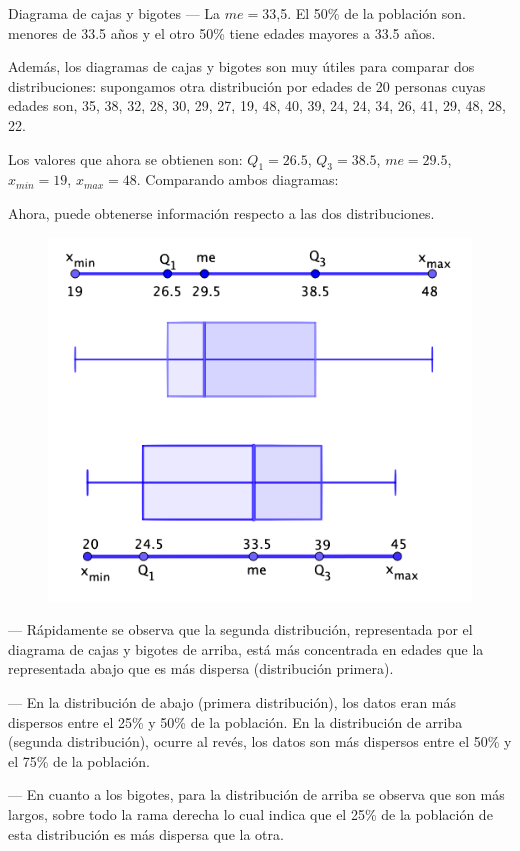 \begin{myalertblock}{Diagrama de cajas y bigotes}
	\vspace{1mm} --- La $me=$33,5. El 50\% de la población son. menores de 33.5 años y el otro 50\% tiene edades mayores a 33.5 años.
	
	\vspace{2mm} Además, los diagramas de cajas y bigotes son muy útiles para comparar dos distribuciones: supongamos otra distribución por edades de 20 personas cuyas edades son, 35, 38, 32, 28, 30, 29, 27, 19, 48, 40, 39, 24, 24, 34, 26, 41, 29, 48, 28, 22.
	
	\vspace{2mm} Los valores que ahora se obtienen son: $Q_1=26.5$, $Q_3=38.5$, $me=29.5$, $x_{min}=19$, $x_{max}=48$. Comparando ambos diagramas:
	
	\vspace{2mm} Ahora, puede obtenerse información respecto a las dos distribuciones.
	 
	 \begin{figure}[H]
			\centering
			\includegraphics[width=.65\textwidth]{imagenes/imagenes01/T01IM16.png}
	\end{figure}
	
	\vspace{1mm} --- Rápidamente se observa que la segunda distribución, representada por el diagrama de cajas y bigotes de arriba, está más concentrada en edades que la representada abajo que es más dispersa (distribución primera). 
	
	\vspace{1mm} --- En la distribución de abajo (primera distribución), los datos eran más dispersos entre el 25\% y 50\% de la población. En la distribución de arriba (segunda distribución), ocurre al revés, los datos son más dispersos entre el 50\% y el 75\% de la población.
	
	\vspace{1mm} --- En cuanto a los bigotes, para la distribución de arriba se observa que son más largos, sobre todo la rama derecha lo cual indica que el 25\% de la población de esta distribución es más dispersa que la otra.
	

\end{myalertblock}
